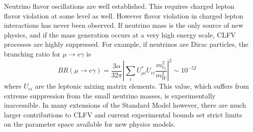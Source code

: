 

Neutrino flavor oscillations are well established. This requires charged lepton flavor violation at some level as well.  However flavor violation in charged lepton interactions has never been observed.
If neutrino mass is the only source of new physics, and if
the mass generation occurs at a very high energy scale, CLFV processes are highly suppressed.  For example, if neutrinos are 
Dirac particles, the branching ratio for $\mu\rightarrow e\gamma$ is
\begin{equation}
BR(\mu \rightarrow e \gamma)=\frac{3\alpha}{32\pi}\left|\sum_i U_{\mu
i}^* U_{e i}\frac{m_{\nu_{i}}^2}{m_{W}^2}\right|^2 \sim 10^{-52}
\end{equation}
where $U_{ei}$ are the leptonic mixing matrix elements. This value,
which suffers from extreme suppression from the small neutrino masses,
is experimentally inaccessible. In many extensions of the Standard Model
however, there are much larger contributions to CLFV and current experimental bounds set strict limits on the parameter space available for new physics models.


